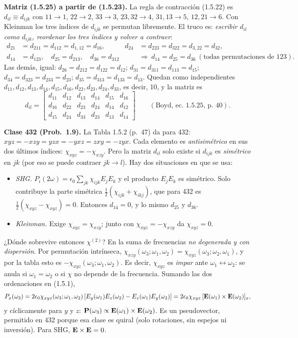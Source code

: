  \textbf{Matriz (1.5.25) a partir de (1.5.23).} La regla de contracción (1.5.22) es $d_{il}\equiv d_{ijk}$ con
$11\to1$, $22\to2$, $33\to3$, $23,32\to4$, $31,13\to5$, $12,21\to6$. Con Kleinman los tres índices de $d_{ijk}$ se permutan libremente.
El truco es: \emph{escribir $d_{il}$ como $d_{ijk}$, reordenar los tres índices y volver a contraer}:
\begin{align*}
d_{21}&=d_{211}=d_{112}=d_{1,12}=d_{16},&
d_{24}&=d_{223}=d_{322}=d_{3,22}=d_{32},\\
d_{14}&=d_{123},\quad d_{25}=d_{213},\quad d_{36}=d_{312}&&\Rightarrow\ d_{14}=d_{25}=d_{36}\ (\text{todas permutaciones de }123).
\end{align*}
Las demás, igual: $d_{26}=d_{212}=d_{122}=d_{12}$; $d_{31}=d_{311}=d_{113}=d_{15}$; $d_{34}=d_{323}=d_{233}=d_{23}$; $d_{35}=d_{313}=d_{133}=d_{13}$.
Quedan como independientes $d_{11},d_{12},d_{13},d_{14},d_{15},d_{16},d_{22},d_{23},d_{24},d_{33}$, es decir, 10, y la matriz es
\[
d_{il}=\begin{bmatrix} d_{11}&d_{12}&d_{13}&d_{14}&d_{15}&d_{16}\\ d_{16}&d_{22}&d_{23}&d_{24}&d_{14}&d_{12}\\ d_{15}&d_{24}&d_{33}&d_{23}&d_{13}&d_{14}\end{bmatrix}
\qquad(\text{Boyd, ec.~1.5.25, p.~40}).
\]

 \textbf{Clase 432 (Prob.~1.9).} La Tabla 1.5.2 (p.~47) da para 432: $xyz=-xzy=yzx=-yxz=zxy=-zyx$. Cada elemento es
\emph{antisimétrico} en sus dos últimos índices: $\chi_{xyz}=-\chi_{xzy}$. Pero la matriz $d_{il}$ solo existe si $d_{ijk}$ es
\emph{simétrico} en $jk$ (por eso se puede contraer $jk\to l$). Hay dos situaciones en que se usa:
\begin{itemize}
\item \emph{SHG.} $P_i(2\omega)=\epsilon_0\sum_{jk}\chi_{ijk}E_jE_k$ y el producto $E_jE_k$ es simétrico. Solo contribuye la parte simétrica
$\frac12(\chi_{ijk}+\chi_{ikj})$, que para 432 es $\frac12(\chi_{xyz}-\chi_{xyz})=0$. Entonces $d_{14}=0$, y lo mismo $d_{25}$ y $d_{36}$.
\item \emph{Kleinman.} Exige $\chi_{xyz}=\chi_{xzy}$; junto con $\chi_{xyz}=-\chi_{xzy}$ da $\chi_{xyz}=0$.
\end{itemize}
¿Dónde sobrevive entonces $\chi^{(2)}$? En la suma de frecuencias \emph{no degenerada y con dispersión}. Por permutación intrínseca,
$\chi_{xzy}(\omega_3;\omega_1,\omega_2)=\chi_{xyz}(\omega_3;\omega_2,\omega_1)$, y por la tabla esto es $-\chi_{xyz}(\omega_3;\omega_1,\omega_2)$. Es decir,
$\chi_{xyz}$ es \emph{impar} ante $\omega_1\leftrightarrow\omega_2$: se anula si $\omega_1=\omega_2$ o si $\chi$ no depende de la frecuencia. Sumando
las dos ordenaciones en (1.5.1),
\[
P_x(\omega_3)=2\epsilon_0\chi_{xyz}(\omega_3;\omega_1,\omega_2)\,[E_y(\omega_1)E_z(\omega_2)-E_z(\omega_1)E_y(\omega_2)]
=2\epsilon_0\chi_{xyz}\,[\mathbf E(\omega_1)\times\mathbf E(\omega_2)]_x,
\]
y cíclicamente para $y$ y $z$: $\mathbf P(\omega_3)\propto\mathbf E(\omega_1)\times\mathbf E(\omega_2)$. Es un pseudovector, permitido en 432 porque esa clase es
quiral (solo rotaciones, sin espejos ni inversión). Para SHG, $\mathbf E\times\mathbf E=0$.

